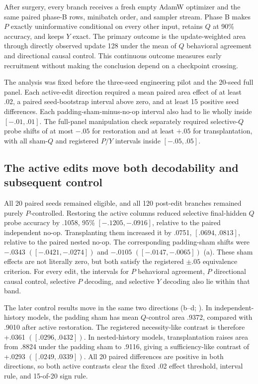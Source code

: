 After surgery, every branch receives a fresh empty AdamW optimizer and the same paired phase-B rows, minibatch order, and sampler stream. Phase B makes $P$ exactly uninformative conditional on every other input, retains $Q$ at 90\% accuracy, and keeps $Y$ exact. The primary outcome is the update-weighted area through directly observed update 128 under the mean of $Q$ behavioral agreement and directional causal control. This continuous outcome measures early recruitment without making the conclusion depend on a checkpoint crossing.

The analysis was fixed before the three-seed engineering pilot and the 20-seed full panel. Each active-edit direction required a mean paired area effect of at least .02, a paired seed-bootstrap interval above zero, and at least 15 positive seed differences. Each padding-sham-minus-no-op interval also had to lie wholly inside $[-.01,.01]$. The full-panel manipulation check separately required selective-$Q$ probe shifts of at most $-.05$ for restoration and at least $+.05$ for transplantation, with all sham-$Q$ and registered $P/Y$ intervals inside $[-.05,.05]$.

\subsection*{The active edits move both decodability and subsequent control}

All 20 paired seeds remained eligible, and all 120 post-edit branches remained purely $P$-controlled. Restoring the active columns reduced selective final-hidden $Q$ probe accuracy by .1058, 95\% \CI{} $[-.1205,-.0916]$, relative to the paired independent no-op. Transplanting them increased it by .0751, $[.0694,.0813]$, relative to the paired nested no-op. The corresponding padding-sham shifts were $-.0343$ $([-.0421,-.0274])$ and $-.0105$ $([-.0147,-.0065])$ (a). These sham effects are not literally zero, but both satisfy the registered $\pm.05$ equivalence criterion. For every edit, the intervals for $P$ behavioral agreement, $P$ directional causal control, selective $P$ decoding, and selective $Y$ decoding also lie within that band.

The later control results move in the same two directions (b--d; ). In independent-history models, the padding sham has mean $Q$-control area .9372, compared with .9010 after active restoration. The registered necessity-like contrast is therefore +.0361 $([.0296,.0432])$. In nested-history models, transplantation raises area from .8824 under the padding sham to .9116, giving a sufficiency-like contrast of +.0293 $([.0249,.0339])$. All 20 paired differences are positive in both directions, so both active contrasts clear the fixed .02 effect threshold, interval rule, and 15-of-20 sign rule.


